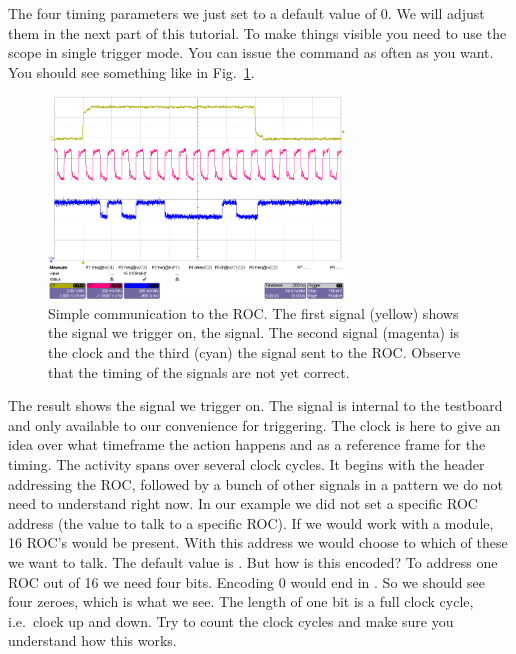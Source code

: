\bigskip

The four timing parameters we just set to a default value of 0. We will adjust them in the next part of this tutorial.
To make things visible you need to use the scope in single trigger mode. You can issue the  command as often as you want. You should see something like in Fig.~\ref{fig:tut_scope2}.

\begin{figure}[h]
    \begin{center}
	\includegraphics[width=0.7\textwidth]{img/tut_scope2.png}
	\caption{Simple communication to the ROC. The first signal (yellow) shows the signal we trigger on, the  signal. The second signal (magenta) is the clock and the third (cyan) the signal sent to the ROC. Observe that the timing of the signals are not yet correct.}
	\label{fig:tut_scope2}
    \end{center}
\end{figure}

The result shows the signal we trigger on. The  signal is internal to the testboard and only available to our convenience for triggering. The clock is here to give an idea over what timeframe the action happens and as a reference frame for the timing. The activity spans over several clock cycles. It begins with the header addressing the ROC, followed by a bunch of other signals in a pattern we do not need to understand right now. In our example we did not set a specific ROC address (the value to talk to a specific ROC). If we would work with a module, 16 ROC's would be present. With this address we would choose to which of these we want to talk. The default value is . But how is this encoded? To address one ROC out of 16 we need four bits. Encoding 0 would end in . So we should see four zeroes, which is what we see. The length of one bit is a full clock cycle, i.e.~clock up and down. Try to count the clock cycles and make sure you understand how this works.

